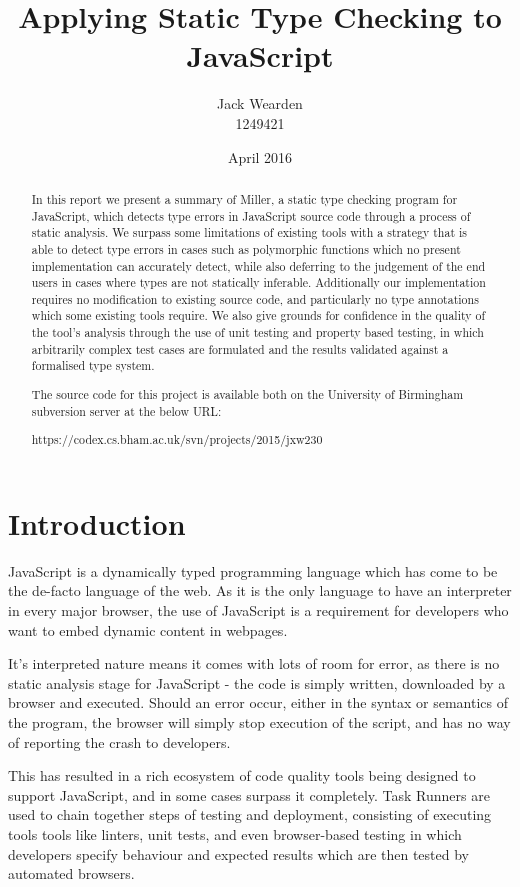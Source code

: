 \documentclass[british, twoside, openright]{bhamthesis}
\title{Applying Static Type Checking to JavaScript}
\author{Jack Wearden\\1249421}
\date{April 2016}  %
\theoremstyle{definition}
\begin{document}
\maketitle

\declaration

\begin{abstract}
  In this report we present a summary of Miller, a static type checking program for JavaScript, which detects type errors in JavaScript source code through a process of static analysis. We surpass some limitations of existing tools with a strategy that is able to detect type errors in cases such as polymorphic functions which no present implementation can accurately detect, while also deferring to the judgement of the end users in cases where types are not statically inferable. Additionally our implementation requires no modification to existing source code, and particularly no type annotations which some existing tools require. We also give grounds for confidence in the quality of the tool's analysis through the use of unit testing and property based testing, in which arbitrarily complex test cases are formulated and the results validated against a formalised type system.

  The source code for this project is available both on the University of Birmingham subversion server at the below URL:

    https://codex.cs.bham.ac.uk/svn/projects/2015/jxw230
\end{abstract}

\tableofcontents

\chapter{Introduction}

  JavaScript is a dynamically typed programming language which has come to be the de-facto language of the web. As it is the only language to have an interpreter in every major browser, the use of JavaScript is a requirement for developers who want to embed dynamic content in webpages.

  It's interpreted nature means it comes with lots of room for error, as there is no static analysis stage for JavaScript - the code is simply written, downloaded by a browser and executed. Should an error occur, either in the syntax or semantics of the program, the browser will simply stop execution of the script, and has no way of reporting the crash to developers.

  This has resulted in a rich ecosystem of code quality tools being designed to support JavaScript, and in some cases surpass it completely. Task Runners are used to chain together steps of testing and deployment, consisting of executing tools tools like linters, unit tests, and even browser-based testing in which developers specify behaviour and expected results which are then tested by automated browsers.
\end{document}
